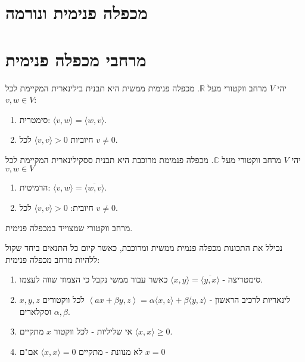 \documentclass{tstextbook}
\begin{document}
\section{מכפלה פנימית ונורמה}

\section{מרחבי מכפלה פנימית}

\begin{definition}
יהי \(V\) מרחב ווקטורי מעל \(\mathbb{R}\). מכפלה פנימית ממשית היא תבנית בילינארית המקיימת לכל \(v,w \in V\):

  \begin{enumerate}
    \item סימטרית: \(\langle v, w \rangle = \langle w, v \rangle\). 


    \item חיוביות \(\langle v, v \rangle > 0\) לכל \(v\neq 0\). 


  \end{enumerate}
\end{definition}
\begin{definition}
יהי \(V\) מרחב ווקטורי מעל \(\mathbb{C}\). מכפלה פנמימת מרוכבת היא תבנית ססקילינארית המקיימת לכל \(v,w \in V\)

  \begin{enumerate}
    \item הרמיטית: \(\langle v, w \rangle = \overline{\langle w, v \rangle}\). 


    \item חיובית: \(\langle v, v \rangle > 0\) לכל \(v\neq 0\). 


  \end{enumerate}
\end{definition}
\begin{definition}
מרחב ווקטורי שמצוייד במכפלה פנימית.

\end{definition}
\begin{proposition}
נכילל את התכונות מכפלה פנמית ממשית ומרוכבת, כאשר קיום כל התנאים ביחד שקול ללהיות מרחב מכפלה פנימית:

  \begin{enumerate}
    \item סימטריצה - \(\langle x,y \rangle=\overline{\langle y,x \rangle}\) כאשר עבור ממשי נקבל כי הצמוד שווה לעצמו. 


    \item לינאריות לרכיב הראשון - \(\left\langle  ax+\beta y  ,z\right\rangle=\alpha \langle x,z \rangle+\beta \langle y,z \rangle\) לכל ווקטורים \(x,y,z\) וסקלארים \(\alpha,\beta\). 


    \item אי שליליות - לכל ווקטור \(x\) מתקיים \(\langle x,x \rangle\geq 0\). 


    \item לא מנוונת - מתקיים \(\langle x,x \rangle=0\) אם"ם \(x=0\)


  \end{enumerate}
\end{proposition}
\end{document}
